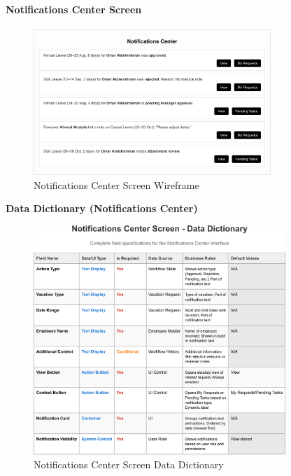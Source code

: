 \documentclass[12pt,a4paper]{article}
\begin{document}
\paragraph{Notifications Center Screen}
\begin{figure}[H]
\centering
\includegraphics[width=0.8\textwidth]{Wireframes/Notifications-Center/Notifications-Center-1.png}
\caption{Notifications Center Screen Wireframe}
\label{fig:wireframe-notifications-center}
\end{figure}

\noindent\textbf{Data Dictionary (Notifications Center)}
\begin{figure}[H]
\centering
\includegraphics[width=0.85\textwidth]{Data-Dictionary/Screen-Data-Dictionaries/Notifications-Center-Screen-Data-Dictionary/Notifications-Center-Screen-Data-Dictionary-1.png}
\caption{Notifications Center Screen Data Dictionary}
\label{fig:notifications-center-data-dict-inline}
\end{figure}
\end{document}
